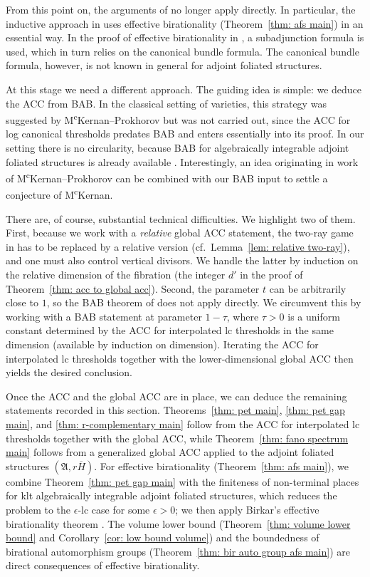 \documentclass[11pt,reqno]{amsart}
\numberwithin{equation}{section}
\newcommand{\Aa}{{\mathfrak{A}}}
\theoremstyle{definition}
\begin{document}
From this point on, the arguments of \cite{HMX14} no longer apply directly. In particular, the inductive approach in \cite{HMX14} uses effective birationality (Theorem~\ref{thm: afs main}) in an essential way. In the proof of effective birationality in \cite[Section~7]{HMX14}, a subadjunction formula is used, which in turn relies on the canonical bundle formula. The canonical bundle formula, however, is not known in general for adjoint foliated structures. 

At this stage we need a different approach. The guiding idea is simple: we deduce the ACC from BAB. In the classical setting of varieties, this strategy was suggested by M\textsuperscript{c}Kernan--Prokhorov \cite{MP04} but was not carried out, since the ACC for log canonical thresholds \cite{HMX14} predates BAB \cite{Bir21a} and enters essentially into its proof. In our setting there is no circularity, because BAB for algebraically integrable adjoint foliated structures is already available \cite{Cas+25a}. Interestingly, an idea originating in work of M\textsuperscript{c}Kernan--Prokhorov \cite{MP04} can be combined with our BAB input to settle a conjecture of M\textsuperscript{c}Kernan.

There are, of course, substantial technical difficulties. We highlight two of them. First, because we work with a \emph{relative} global ACC statement, the two-ray game in \cite{MP04} has to be replaced by a relative version (cf.~Lemma~\ref{lem: relative two-ray}), and one must also control vertical divisors. We handle the latter by induction on the relative dimension of the fibration (the integer $d'$ in the proof of Theorem~\ref{thm: acc to global acc}). Second, the parameter $t$ can be arbitrarily close to $1$, so the BAB theorem of \cite{Cas+25a} does not apply directly. We circumvent this by working with a BAB statement at parameter $1-\tau$, where $\tau>0$ is a uniform constant determined by the ACC for interpolated lc thresholds in the same dimension (available by induction on dimension). Iterating the ACC for interpolated lc thresholds together with the lower-dimensional global ACC then yields the desired conclusion.

Once the ACC and the global ACC are in place, we can deduce the remaining statements recorded in this section. Theorems~\ref{thm: pet main}, \ref{thm: pet gap main}, and \ref{thm: r-complementary main} follow from the ACC for interpolated lc thresholds together with the global ACC, while Theorem~\ref{thm: fano spectrum main} follows from a generalized global ACC applied to the adjoint foliated structures $\left(\Aa,r\overline{H}\right)$. For effective birationality (Theorem~\ref{thm: afs main}), we combine Theorem~\ref{thm: pet gap main} with the finiteness of non-terminal places for klt algebraically integrable adjoint foliated structures, which reduces the problem to the $\epsilon$-lc case for some $\epsilon>0$; we then apply Birkar's effective birationality theorem \cite[Theorem~4.2]{Bir23a}. The volume lower bound (Theorem~\ref{thm: volume lower bound} and Corollary~\ref{cor: low bound volume}) and the boundedness of birational automorphism groups (Theorem~\ref{thm: bir auto group afs main}) are direct consequences of effective birationality.
\end{document}
